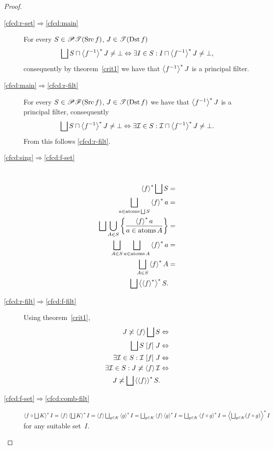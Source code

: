 \begin{proof}
~
\begin{description}
\item [{\ref{cfcd:r-set}$\Rightarrow$\ref{cfcd:main}}] For every
$S\in\mathscr{P}\mathscr{T}(\operatorname{Src} f)$,
$J\in\mathscr{T}(\operatorname{Dst} f)$
\[
\bigsqcup S\sqcap\rsupfun{f^{-1}}J\ne\bot\Leftrightarrow\exists I\in
S:I\sqcap\rsupfun{f^{-1}}J\ne\bot,
\]
consequently by theorem~\ref{crit1} we have that $\left\langle f^{-1}\right\rangle ^{\ast}J$
is a principal filter.
\item [{\ref{cfcd:main}$\Rightarrow$\ref{cfcd:r-filt}}] For every
$S\in\mathscr{P}\mathscr{F}(\operatorname{Src} f)$,
$J\in\mathscr{T}(\operatorname{Dst} f)$ we have that $\left\langle f^{-1}\right\rangle ^{\ast}J$ is a
principal filter, consequently
\[
\bigsqcup S\sqcap\rsupfun{f^{-1}}J\ne\bot \Leftrightarrow\exists\mathcal{I}\in
S:\mathcal{I}\sqcap\rsupfun{f^{-1}}J\ne\bot.
\]
From this follows \ref{cfcd:r-filt}.
\item [{\ref{cfcd:sing}$\Rightarrow$\ref{cfcd:f-set}}] ~
\begin{align*}
\rsupfun f\bigsqcup S & =\\
\bigsqcup_{a\in\atoms\bigsqcup S}\rsupfun fa & =\\
\bigsqcup\bigcup_{A\in S}\setcond{\rsupfun fa}{a\in\atoms A} & =\\
\bigsqcup_{A\in S}\bigsqcup_{a\in\atoms A}\rsupfun fa & =\\
\bigsqcup_{A\in S}\rsupfun fA & =\\
\bigsqcup\rsupfun{\rsupfun f}S.
\end{align*}

\item [{\ref{cfcd:r-filt}$\Rightarrow$\ref{cfcd:f-filt}}] Using
theorem~\ref{crit1},
\begin{align*}
J\nasymp\supfun f\bigsqcup S & \Leftrightarrow\\
\bigsqcup S\suprel fJ & \Leftrightarrow\\
\exists\mathcal{I}\in S:\mathcal{I}\suprel fJ & \Leftrightarrow\\
\exists\mathcal{I}\in S:J\nasymp\supfun f\mathcal{I} & \Leftrightarrow\\
J\nasymp\bigsqcup\rsupfun{\supfun f}S.
\end{align*}

\item[\ref{cfcd:f-set}$\Rightarrow$\ref{cfcd:comb-filt}]
$\rsupfun{f\circ\bigsqcup K}I=\supfun{f}\rsupfun{\bigsqcup K}I=\supfun{f}\bigsqcup_{g\in K}\rsupfun{g}I=\bigsqcup_{g\in K}\supfun{f}\rsupfun{g}I=\bigsqcup_{g\in K}\rsupfun{f\circ g}I=\rsupfun{\bigsqcup_{g\in K}(f\circ g)}I$
for any suitable set~$I$.


\end{description}
\end{proof}
